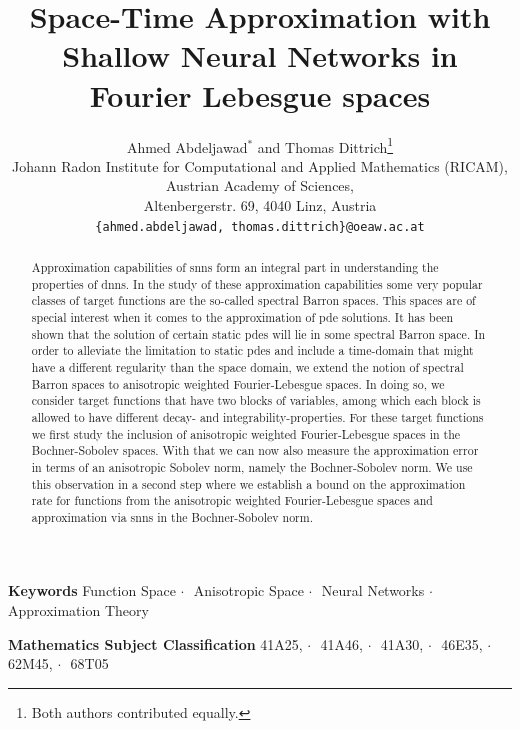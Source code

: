 \documentclass[a4paper]{article}
\title
{Space-Time Approximation with Shallow Neural Networks
	in Fourier Lebesgue spaces}
\author{Ahmed Abdeljawad$^*$
        and Thomas Dittrich\thanks{Both authors contributed equally.}
		\\[1ex]
	Johann Radon Institute for Computational and Applied Mathematics (RICAM),\\
    Austrian Academy of Sciences,\\
    Altenbergerstr. 69, 4040 Linz, Austria
	\\
	\texttt{\{ahmed.abdeljawad, thomas.dittrich\}@oeaw.ac.at}}
\numberwithin{equation}{section}
\theoremstyle{remark}
\providecommand{\keywords}[1]
{
  \small	
  \textbf{Keywords} #1
}
\providecommand{\msc}[1]
{
  \small	
  \textbf{Mathematics Subject Classification} #1
}
\begin{document}
	
\maketitle
	
\begin{abstract}
    Approximation capabilities of \glspl{snn}
    form an integral part in understanding the properties of \glspl{dnn}.
    In the study of these approximation capabilities some very popular
    classes of target functions are the so-called spectral Barron spaces.
    This spaces are of special interest
    when it comes to the approximation of \gls{pde} solutions.
    It has been shown that the solution of
    certain static \glspl{pde} will lie in some spectral Barron space.
    In order to alleviate the limitation to static \glspl{pde} and
    include a time-domain that might have
    a different regularity than the space domain,
    we extend the notion of spectral Barron spaces
    to anisotropic weighted Fourier-Lebesgue spaces.
    In doing so, we consider target functions
    that have two blocks of variables,
    among which each block is allowed
    to have different decay- and integrability-properties.
    For these target functions we first study the
    inclusion of anisotropic weighted Fourier-Lebesgue spaces
    in the Bochner-Sobolev spaces.
    With that we can now also measure the approximation error
    in terms of an anisotropic Sobolev norm,
    namely the Bochner-Sobolev norm.
    We use this observation in a second step where we
    establish a bound on the approximation rate 
    for functions from the anisotropic weighted Fourier-Lebesgue spaces
    and approximation via \glspl{snn} in the Bochner-Sobolev norm.
\end{abstract}

 
\keywords{
Function Space$\,\cdot\,$%
Anisotropic Space$\,\cdot\,$%
Neural Networks$\,\cdot\,$%
Approximation Theory
}

\msc{
41A25,$\,\cdot\,$%
41A46,$\,\cdot\,$%
41A30,$\,\cdot\,$%
46E35,$\,\cdot\,$%
62M45,$\,\cdot\,$%
68T05
}
	
	
\end{document}
